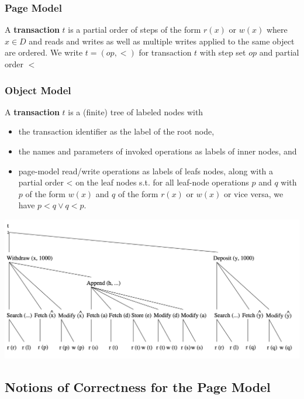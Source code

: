 \documentclass[11pt]{article}
\begin{document}
\subsubsection{Page Model}
\label{sec:org13e1f50}
\begin{definition}
A \textbf{transaction} \(t\) is a partial order of steps of the form \(r(x)\) or \(w(x)\)
where \(x\in D\) and reads and writes as well as multiple writes applied to the same object are
ordered. We write \(t=(op,<)\) for transaction \(t\) with step set \(op\) and partial order \(<\)
\end{definition}
\subsubsection{Object Model}
\label{sec:org2d241a2}
\begin{definition}
A \textbf{transaction} \(t\) is a (finite) tree of labeled nodes with
\begin{itemize}
\item the transaction identifier as the label of the root node,
\item the names and parameters of invoked operations as labels of inner nodes, and
\item page-model read/write operations as labels of leafs nodes, along with a partial order < on the
leaf nodes s.t. for all leaf-node operations \(p\) and \(q\) with \(p\) of the form \(w(x)\)
and \(q\) of the form \(r(x)\) or \(w(x)\) or vice versa, we have \(p<q\vee q<p\).
\end{itemize}
\end{definition}

\begin{center}
\includegraphics[width=.8\textwidth]{../images/bigdatabase/1.png}
\label{}
\end{center}
\subsection{Notions of Correctness for the Page Model}
\label{sec:org16ba78e}
\end{document}
